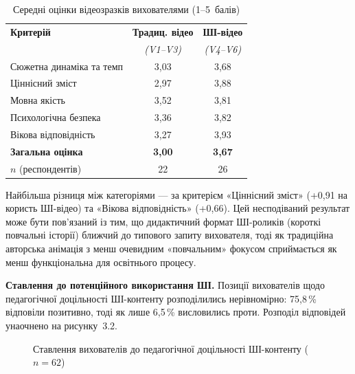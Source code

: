 \documentclass[14pt, a4paper]{extreport}
\begin{document}
\begin{table}[htbp]
\caption{Середні оцінки відеозразків вихователями (1--5~балів)}
\centering
\begin{tabular}{|l|c|c|}
\hline
\rowcolor{tblhead}\textbf{Критерій} & \textbf{Традиц. відео} & \textbf{ШІ-відео} \\
\rowcolor{tblhead} & \textit{(V1--V3)} & \textit{(V4--V6)} \\
\hline
Сюжетна динаміка та темп  & 3{,}03 & 3{,}68 \\
Ціннісний зміст            & 2{,}97 & 3{,}88 \\
Мовна якість               & 3{,}52 & 3{,}81 \\
Психологічна безпека       & 3{,}36 & 3{,}82 \\
Вікова відповідність       & 3{,}27 & 3{,}93 \\
\textbf{Загальна оцінка}   & \textbf{3{,}00} & \textbf{3{,}67} \\
\hline
$n$ (респондентів) & 22 & 26 \\
\hline
\end{tabular}
\end{table}

Найбільша різниця між категоріями --- за критерієм «Ціннісний зміст» (+0{,}91 на користь ШІ-відео) та «Вікова відповідність» (+0{,}66). Цей несподіваний результат може бути пов'язаний із тим, що дидактичний формат ШІ-роликів (короткі повчальні історії) ближчий до типового запиту вихователя, тоді як традиційна авторська анімація з менш очевидним «повчальним» фокусом сприймається як менш функціональна для освітнього процесу.

\textbf{Ставлення до потенційного використання ШІ.} Позиції вихователів щодо педагогічної доцільності ШІ-контенту розподілились нерівномірно: 75{,}8\,\% відповіли позитивно, тоді як лише 6{,}5\,\% висловились проти. Розподіл відповідей унаочнено на рисунку~3.2.

\begin{figure}[htbp]
\centering
{}
\caption{Ставлення вихователів до педагогічної доцільності ШІ-контенту ($n=62$)}
\end{figure}
\end{document}
